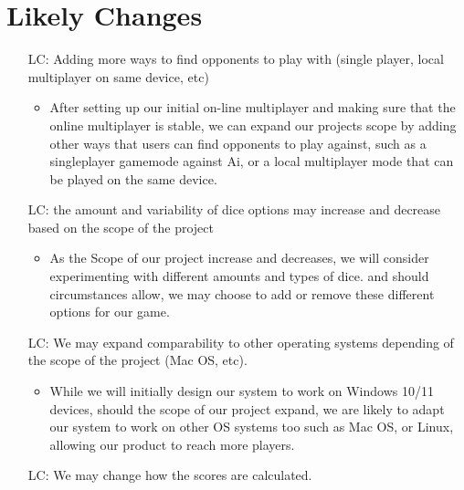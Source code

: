 \section{Likely Changes}    

\noindent \begin{itemize}

\item[LC\refstepcounter{lcnum}\thelcnum\label{LC_meaningfulLabel}:] Adding more ways to find opponents to play with (single player, local multiplayer on same device, etc)

\begin{itemize}
	\item After setting up our initial on-line multiplayer and making sure that the online multiplayer is stable, we can expand our projects scope by adding other ways that users can find opponents to play against, such as a singleplayer gamemode against Ai, or a local multiplayer mode that can be played on the same device.
\end{itemize}

\item[LC\refstepcounter{lcnum}\thelcnum\label{LC_meaningfulLabel}:] the amount and variability of dice options may increase and decrease based on the scope of the project

\begin{itemize}
	\item As the Scope of our project increase and decreases, we will consider experimenting with different amounts and types of dice. and should circumstances allow, we may choose to add or remove these different options for our game.
\end{itemize}

\item[LC\refstepcounter{lcnum}\thelcnum\label{LC_meaningfulLabel}:] We may expand comparability to other operating systems depending of the scope of the project (Mac OS, etc).

\begin{itemize}
	\item While we will initially design our system to work on Windows 10/11 devices, should the scope of our project expand, we are likely to adapt our system to work on other OS systems too such as Mac OS, or Linux, allowing our product to reach more players.
\end{itemize}

\item[LC\refstepcounter{lcnum}\thelcnum\label{LC_meaningfulLabel}:] We may change how the scores are calculated.


\end{itemize}
